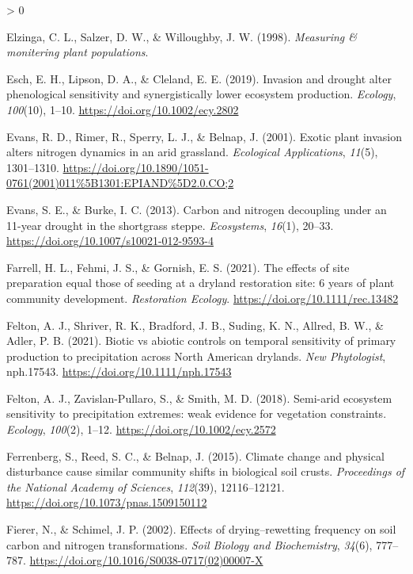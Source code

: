 \documentclass[
  11pt,
  a4paper,
]{article}
\newlength{\cslhangindent}
\newenvironment{CSLReferences}[2] %
 {%
  \setlength{\parindent}{0pt}
  \ifodd #1 \everypar{\setlength{\hangindent}{\cslhangindent}}\ignorespaces\fi
  \ifnum #2 > 0
  \setlength{\parskip}{#2\baselineskip}
  \fi
 }%
 {}
\begin{document}
\begin{CSLReferences}{1}{0}
\leavevmode\hypertarget{ref-Elzinga1998}{}%
Elzinga, C. L., Salzer, D. W., \& Willoughby, J. W. (1998). \emph{Measuring \& monitering plant populations}.

\leavevmode\hypertarget{ref-Esch2019}{}%
Esch, E. H., Lipson, D. A., \& Cleland, E. E. (2019). {Invasion and drought alter phenological sensitivity and synergistically lower ecosystem production}. \emph{Ecology}, \emph{100}(10), 1--10. \url{https://doi.org/10.1002/ecy.2802}

\leavevmode\hypertarget{ref-Evans2001}{}%
Evans, R. D., Rimer, R., Sperry, L. J., \& Belnap, J. (2001). {Exotic plant invasion alters nitrogen dynamics in an arid grassland}. \emph{Ecological Applications}, \emph{11}(5), 1301--1310. \url{https://doi.org/10.1890/1051-0761(2001)011\%5B1301:EPIAND\%5D2.0.CO;2}

\leavevmode\hypertarget{ref-Evans2013}{}%
Evans, S. E., \& Burke, I. C. (2013). {Carbon and nitrogen decoupling under an 11-year drought in the shortgrass steppe}. \emph{Ecosystems}, \emph{16}(1), 20--33. \url{https://doi.org/10.1007/s10021-012-9593-4}

\leavevmode\hypertarget{ref-Farrell2021}{}%
Farrell, H. L., Fehmi, J. S., \& Gornish, E. S. (2021). The effects of site preparation equal those of seeding at a dryland restoration site: 6 years of plant community development. \emph{Restoration Ecology}. \url{https://doi.org/10.1111/rec.13482}

\leavevmode\hypertarget{ref-Felton2021}{}%
Felton, A. J., Shriver, R. K., Bradford, J. B., Suding, K. N., Allred, B. W., \& Adler, P. B. (2021). Biotic vs abiotic controls on temporal sensitivity of primary production to precipitation across {North} {American} drylands. \emph{New Phytologist}, nph.17543. \url{https://doi.org/10.1111/nph.17543}

\leavevmode\hypertarget{ref-Felton2018}{}%
Felton, A. J., Zavislan-Pullaro, S., \& Smith, M. D. (2018). {Semi-arid ecosystem sensitivity to precipitation extremes: weak evidence for vegetation constraints}. \emph{Ecology}, \emph{100}(2), 1--12. \url{https://doi.org/10.1002/ecy.2572}

\leavevmode\hypertarget{ref-Ferrenberg2015}{}%
Ferrenberg, S., Reed, S. C., \& Belnap, J. (2015). {Climate change and physical disturbance cause similar community shifts in biological soil crusts}. \emph{Proceedings of the National Academy of Sciences}, \emph{112}(39), 12116--12121. \url{https://doi.org/10.1073/pnas.1509150112}

\leavevmode\hypertarget{ref-Fierer2002}{}%
Fierer, N., \& Schimel, J. P. (2002). Effects of drying--rewetting frequency on soil carbon and nitrogen transformations. \emph{Soil Biology and Biochemistry}, \emph{34}(6), 777--787. \url{https://doi.org/10.1016/S0038-0717(02)00007-X}


\end{CSLReferences}
\end{document}
